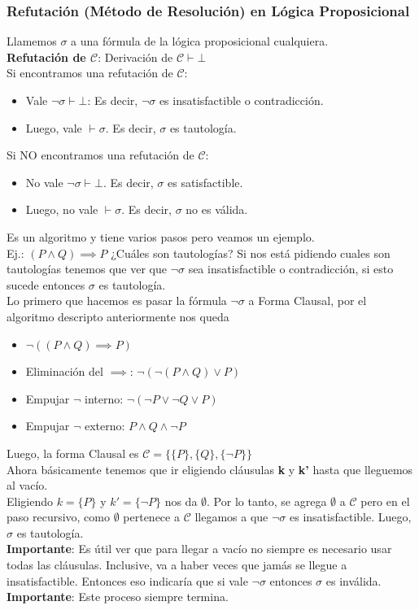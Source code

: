 \documentclass[10pt,a4paper]{article}
\begin{document}
\subsubsection*{Refutación (Método de Resolución) en Lógica Proposicional}
Llamemos $\sigma$ a una fórmula de la lógica proposicional cualquiera. \\
\textbf{Refutación de $\mathcal{C}$}: Derivación de $\mathcal{C} \vdash \bot$ \\
Si encontramos una refutación de $\mathcal{C}$: 
\begin{itemize}
    \item Vale $\neg \sigma \vdash \bot$: Es decir, $\neg \sigma$ es insatisfactible o contradicción.
    \item Luego, vale $\vdash \sigma$. Es decir, $\sigma$ es tautología.
\end{itemize}
Si NO encontramos una refutación de $\mathcal{C}$:
\begin{itemize}
    \item No vale $\neg \sigma \vdash \bot$. Es decir, $\sigma$ es satisfactible.
    \item Luego, no vale $\vdash \sigma$. Es decir, $\sigma$ no es válida.
\end{itemize}
Es un algoritmo y tiene varios pasos pero veamos un ejemplo. \\
Ej.: $(P \land Q) \implies P$ ¿Cuáles son tautologías?  Si nos está pidiendo cuales son tautologías tenemos que ver que $\neg \sigma$ sea insatisfactible o contradicción, si esto sucede entonces $\sigma$ es tautología. \\
Lo primero que hacemos es pasar la fórmula $\neg \sigma$ a Forma Clausal, por el algoritmo descripto anteriormente nos queda
\begin{itemize}
    \item $\neg ((P \land Q) \implies P)$
    \item Eliminación del $\implies$: $\neg (\neg(P \land Q) \lor P)$
    \item Empujar $\neg$ interno: $\neg (\neg P \lor \neg Q \lor P)$
    \item Empujar $\neg$ externo: $P \land Q \land \neg P$
\end{itemize}
Luego, la forma Clausal es $\mathcal{C} = \{\{P\}, \{Q\}, \{\neg P\}\}$ \\
Ahora básicamente tenemos que ir eligiendo cláusulas \textbf{k} y \textbf{k'} hasta que lleguemos al vacío. \\
Eligiendo $k=\{P\}$ y $k'=\{\neg P\}$ nos da $\emptyset$. Por lo tanto, se agrega $\emptyset$ a $\mathcal{C}$ pero en el paso recursivo, como $\emptyset$ pertenece a $\mathcal{C}$ llegamos a que $\neg \sigma$ es insatisfactible. Luego, $\sigma$ es tautología. \\
\textbf{Importante}: Es útil ver que para llegar a vacío no siempre es necesario usar todas las cláusulas. Inclusive, va a haber veces que jamás se llegue a insatisfactible. Entonces eso indicaría que si vale $\neg \sigma$ entonces $\sigma$ es inválida. \\
\textbf{Importante}: Este proceso siempre termina.
\end{document}
